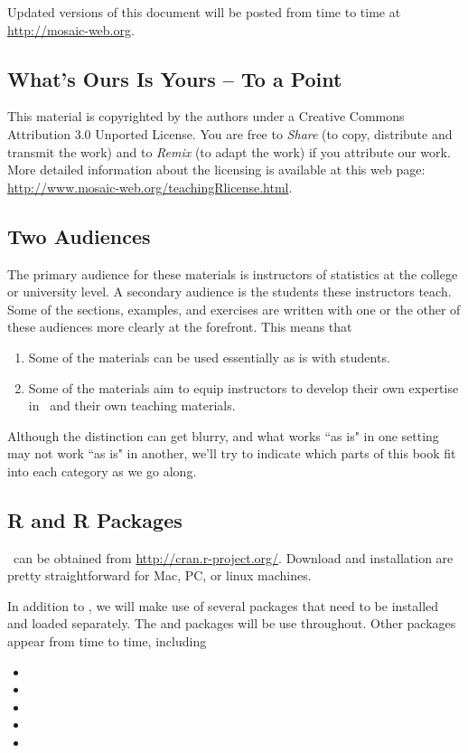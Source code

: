 Updated versions of this document will be posted from time to time at
\url{http://mosaic-web.org}.

\subsection*{What's Ours Is Yours -- To a Point}

This material is copyrighted by the authors under a Creative Commons Attribution 3.0 
Unported License.
You are free to \emph{Share} (to copy, distribute and transmit the work) and to \emph{Remix} 
(to adapt the work) if you attribute our work.
More detailed information about the licensing is available at this web page:
\url{http://www.mosaic-web.org/teachingRlicense.html}.

\subsection*{Two Audiences}

The primary audience for these materials is instructors of statistics at the college or
university level.  A secondary audience is the students these instructors teach.  
Some of the sections, examples, and exercises are written with one or the other of 
these audiences more clearly at the forefront.  This means that 
\begin{enumerate}
\item Some of the materials can be used essentially as is with students.
\item Some of the materials aim to equip instructors to develop their own
expertise in \R\ and their own teaching materials.
\end{enumerate}

Although the distinction can get blurry, and what works ``as is" in one setting may 
not work ``as is" in another,  we'll try to indicate which parts of this 
book fit into each category as we go along.

\subsection*{R and R Packages}

\R\ can be obtained from \url{http://cran.r-project.org/}.  
Download and installation are pretty straightforward for Mac, PC, or linux machines.

In addition to \R, we will make use of several packages that need to be installed
and loaded separately. The  and  packages
will be use throughout.  Other packages appear from time to time, including
\begin{multicols}{3}
\begin{itemize}
\item
{}
\item
{}
\item
{}
\item
{}
\item
{}
\end{itemize}
\end{multicols}

